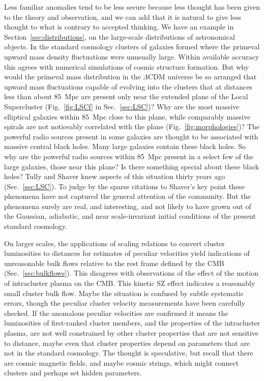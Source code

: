 \documentclass[fleqn,usenatbib]{mnras}
\begin{document}
Less familiar anomalies tend to be less secure because less thought has been given to the theory and observation, and we can add that it is natural to give less thought to what is contrary to accepted thinking. We have an example in Section~\ref{sec:distributions}, on the large-scale distributions of astronomical objects. In the standard cosmology clusters of galaxies formed where the primeval upward mass density fluctuations were unusually large. Within available accuracy this agrees with numerical simulations of cosmic structure formation. But why would the primeval mass distribution in the $\Lambda$CDM universe be so arranged that upward mass fluctuations capable of evolving into the clusters that at distances less than about 85~Mpc are present only near the extended plane of the Local Supercluster (Fig.~\ref{fig:LSCf} in Sec.~\ref{sec:LSC})? Why are the most massive elliptical galaxies within 85~Mpc close to this plane, while comparably massive spirals are not noticeably correlated with the plane (Fig.~\ref{fig:morphologies})? The powerful radio sources present in some galaxies are thought to be associated with massive central black holes. Many large galaxies contain these black holes. So why are the powerful radio sources within 85~Mpc present in a select few of the large galaxies, those near this plane? Is there something special about these black holes? Tully and Shaver knew aspects of this situation thirty years ago (Sec.~\ref{sec:LSC}). To judge by the sparse citations to Shaver's key point these phenomena have not captured the general attention of the community. But the phenomena surely are real, and interesting, and not likely to have grown out of the Gaussian, adiabatic, and near scale-invariant initial conditions of the present standard cosmology. 

On larger scales, the applications of scaling relations to convert cluster luminosities to distances for estimates of peculiar velocities yield indications of unreasonable bulk flows relative to the rest frame defined by the CMB (Sec.~\ref{sec:bulkflows}). This disagrees with observations of the effect of the motion of intracluster plasma on the CMB. This kinetic SZ effect indicates a reasonably small cluster bulk flow. Maybe the situation is confused by subtle systematic errors, though the peculiar cluster velocity measurements  have been carefully checked. If the anomalous peculiar velocities are confirmed it means the luminosities of first-ranked cluster members, and the properties of the intracluster plasma, are not well constrained by other cluster properties that are not sensitive to distance, maybe even that cluster properties depend on parameters that are not in the standard cosmology. The thought is speculative, but recall that there are cosmic magnetic fields, and maybe cosmic strings, which might connect clusters and perhaps set hidden parameters.
\end{document}

